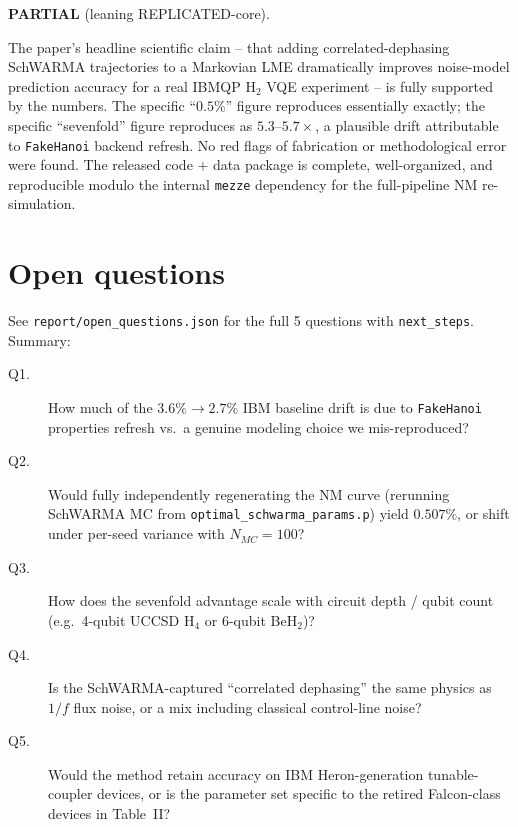 \documentclass[11pt]{article}
\begin{document}
\textbf{PARTIAL} (leaning REPLICATED-core).

The paper's headline scientific claim -- that adding correlated-dephasing SchWARMA trajectories to a Markovian LME dramatically improves noise-model prediction accuracy for a real IBMQP H$_2$ VQE experiment -- is fully supported by the numbers. The specific ``$0.5\%$'' figure reproduces essentially exactly; the specific ``sevenfold'' figure reproduces as $5.3$--$5.7\times$, a plausible drift attributable to \texttt{FakeHanoi} backend refresh. No red flags of fabrication or methodological error were found. The released code + data package is complete, well-organized, and reproducible modulo the internal \texttt{mezze} dependency for the full-pipeline NM re-simulation.

\section{Open questions}
\label{sec:open}

See \texttt{report/open\_questions.json} for the full 5 questions with \texttt{next\_steps}. Summary:

\begin{description}
  \item[Q1.] How much of the $3.6\% \to 2.7\%$ IBM baseline drift is due to \texttt{FakeHanoi} properties refresh vs.\ a genuine modeling choice we mis-reproduced?
  \item[Q2.] Would fully independently regenerating the NM curve (rerunning SchWARMA MC from \texttt{optimal\_schwarma\_params.p}) yield $0.507\%$, or shift under per-seed variance with $N_{MC}=100$?
  \item[Q3.] How does the sevenfold advantage scale with circuit depth / qubit count (e.g.\ 4-qubit UCCSD H$_4$ or 6-qubit BeH$_2$)?
  \item[Q4.] Is the SchWARMA-captured ``correlated dephasing'' the same physics as $1/f$ flux noise, or a mix including classical control-line noise?
  \item[Q5.] Would the method retain accuracy on IBM Heron-generation tunable-coupler devices, or is the parameter set specific to the retired Falcon-class devices in Table~II?
\end{description}
\end{document}
